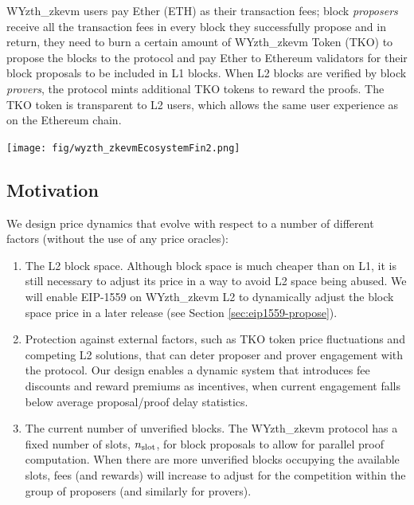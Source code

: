 \documentclass[9pt,oneside]{amsart}
\newenvironment{Figure}
  {\par\medskip\noindent\minipage{\linewidth}}
  {\endminipage\par\medskip}
\begin{document}
\begin{multicols}{2}
WYzth_zkevm users pay Ether (ETH) as their transaction fees; block \emph{proposers} receive all the transaction fees in every block they successfully propose and in return, they need to burn a certain amount of WYzth_zkevm Token (TKO) to propose the blocks to the protocol and pay Ether to Ethereum validators for their block proposals to be included in L1 blocks. When L2 blocks are verified by block \emph{provers}, the protocol mints additional TKO tokens to reward the proofs. The TKO token is transparent to L2 users, which allows the same user experience as on the Ethereum chain.

\begin{Figure}
 \centering
 \texttt{[image: fig/wyzth\_zkevmEcosystemFin2.png]}
 \label{fig:taiExchange}
 
\end{Figure}


\subsection{Motivation}
We design price dynamics that evolve with respect to a number of different factors (without the use of any price oracles):
\begin{enumerate}
\item The L2 block space. Although block space is much cheaper than on L1, it is still necessary to adjust its price in a way to avoid L2 space being abused. We will enable EIP-1559 on WYzth_zkevm L2 to dynamically adjust the block space price in a later release (see Section \ref{sec:eip1559-propose}).
\item Protection against external factors, such as TKO token price fluctuations and competing L2 solutions, that can deter proposer and prover engagement with the protocol. Our design enables a dynamic system that introduces fee discounts and reward premiums as incentives, when current engagement falls below average proposal/proof delay statistics. 

\item The current number of unverified blocks. The WYzth_zkevm protocol has a fixed number of slots, $n_\textnormal{slot}$, for block proposals to allow for parallel proof computation. When there are more unverified blocks occupying the available slots, fees (and rewards) will increase to adjust for the competition within the group of proposers (and similarly for provers).


\end{enumerate}
\end{multicols}
\end{document}
